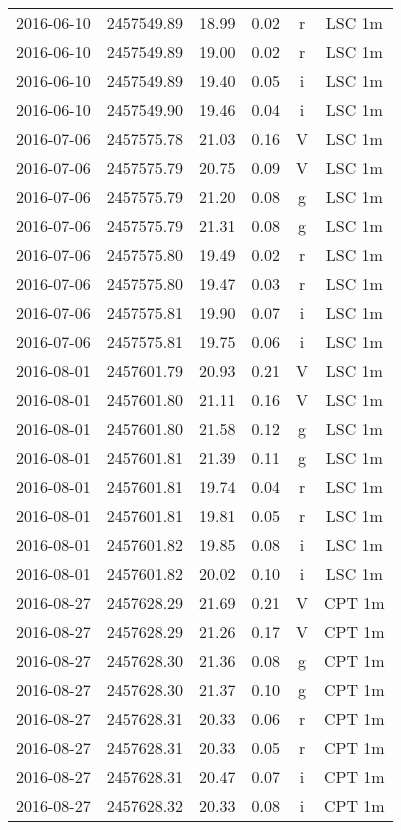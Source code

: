 \begin{table}
\begin{tabular}{cccccc}
2016-06-10 & 2457549.89 & 18.99 & 0.02 & r & LSC 1m \\
2016-06-10 & 2457549.89 & 19.00 & 0.02 & r & LSC 1m \\
2016-06-10 & 2457549.89 & 19.40 & 0.05 & i & LSC 1m \\
2016-06-10 & 2457549.90 & 19.46 & 0.04 & i & LSC 1m \\
2016-07-06 & 2457575.78 & 21.03 & 0.16 & V & LSC 1m \\
2016-07-06 & 2457575.79 & 20.75 & 0.09 & V & LSC 1m \\
2016-07-06 & 2457575.79 & 21.20 & 0.08 & g & LSC 1m \\
2016-07-06 & 2457575.79 & 21.31 & 0.08 & g & LSC 1m \\
2016-07-06 & 2457575.80 & 19.49 & 0.02 & r & LSC 1m \\
2016-07-06 & 2457575.80 & 19.47 & 0.03 & r & LSC 1m \\
2016-07-06 & 2457575.81 & 19.90 & 0.07 & i & LSC 1m \\
2016-07-06 & 2457575.81 & 19.75 & 0.06 & i & LSC 1m \\
2016-08-01 & 2457601.79 & 20.93 & 0.21 & V & LSC 1m \\
2016-08-01 & 2457601.80 & 21.11 & 0.16 & V & LSC 1m \\
2016-08-01 & 2457601.80 & 21.58 & 0.12 & g & LSC 1m \\
2016-08-01 & 2457601.81 & 21.39 & 0.11 & g & LSC 1m \\
2016-08-01 & 2457601.81 & 19.74 & 0.04 & r & LSC 1m \\
2016-08-01 & 2457601.81 & 19.81 & 0.05 & r & LSC 1m \\
2016-08-01 & 2457601.82 & 19.85 & 0.08 & i & LSC 1m \\
2016-08-01 & 2457601.82 & 20.02 & 0.10 & i & LSC 1m \\
2016-08-27 & 2457628.29 & 21.69 & 0.21 & V & CPT 1m \\
2016-08-27 & 2457628.29 & 21.26 & 0.17 & V & CPT 1m \\
2016-08-27 & 2457628.30 & 21.36 & 0.08 & g & CPT 1m \\
2016-08-27 & 2457628.30 & 21.37 & 0.10 & g & CPT 1m \\
2016-08-27 & 2457628.31 & 20.33 & 0.06 & r & CPT 1m \\
2016-08-27 & 2457628.31 & 20.33 & 0.05 & r & CPT 1m \\
2016-08-27 & 2457628.31 & 20.47 & 0.07 & i & CPT 1m \\
2016-08-27 & 2457628.32 & 20.33 & 0.08 & i & CPT 1m \\

\end{tabular}
\end{table}
